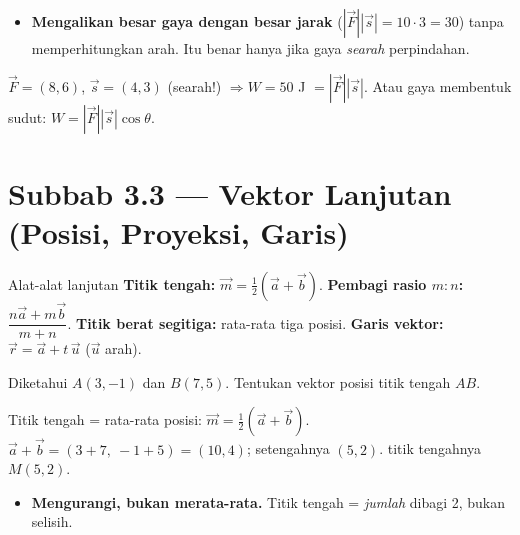 \begin{jebakan}
\begin{itemize}[leftmargin=*,topsep=2pt]
  \item \textbf{Mengalikan besar gaya dengan besar jarak} ($|\vec F||\vec s|
  =10\cdot3=30$) tanpa memperhitungkan arah. Itu benar hanya jika gaya
  \emph{searah} perpindahan.
\end{itemize}
\end{jebakan}

\begin{variasi}
$\vec F=(8,6)$, $\vec s=(4,3)$ (searah!) $\Rightarrow W=50$ J $=|\vec F||\vec s|$.
Atau gaya membentuk sudut: $W=|\vec F||\vec s|\cos\theta$.
\end{variasi}

\section*{Subbab 3.3 — Vektor Lanjutan (Posisi, Proyeksi, Garis)}

\begin{ingat}{Alat-alat lanjutan}
\textbf{Titik tengah:} $\vec m=\frac12(\vec a+\vec b)$.\quad
\textbf{Pembagi rasio $m:n$:} $\dfrac{n\vec a+m\vec b}{m+n}$.\quad
\textbf{Titik berat segitiga:} rata-rata tiga posisi.\quad
\textbf{Garis vektor:} $\vec r=\vec a+t\,\vec u$ ($\vec u$ arah).
\end{ingat}

\begin{soalbox}{}
Diketahui $A(3,-1)$ dan $B(7,5)$. Tentukan vektor posisi titik tengah $AB$.
\end{soalbox}

\jawab
{} Titik tengah = rata-rata posisi:
$\vec m=\frac12(\vec a+\vec b)$.
 $\vec a+\vec b=(3+7,\ -1+5)=(10,4)$; setengahnya $(5,2)$.
\jadi titik tengahnya $M(5,2)$.

\begin{jebakan}
\begin{itemize}[leftmargin=*,topsep=2pt]
  \item \textbf{Mengurangi, bukan merata-rata.} Titik tengah = \emph{jumlah}
  dibagi 2, bukan selisih.
\end{itemize}
\end{jebakan}

